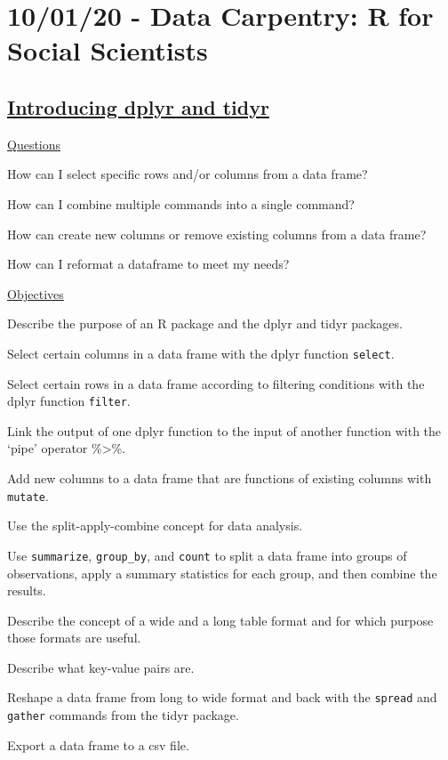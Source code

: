 \documentclass[12pt]{article}
\begin{document}
\newpage\flushleft\section{10/01/20 - Data Carpentry: R for Social Scientists}
\subsection{\href{https://datacarpentry.org/r-socialsci/03-dplyr-tidyr/index.html}{\textbf{Introducing dplyr and tidyr}}}
\color{gray}
\underline{Questions}

How can I select specific rows and/or columns from a data frame?

How can I combine multiple commands into a single command?

How can create new columns or remove existing columns from a data frame?

How can I reformat a dataframe to meet my needs?

\underline{Objectives}

Describe the purpose of an R package and the dplyr and tidyr packages.

Select certain columns in a data frame with the dplyr function \texttt{select}.

Select certain rows in a data frame according to filtering conditions with the dplyr function \texttt{filter}.

Link the output of one dplyr function to the input of another function with the ‘pipe’ operator \%\textgreater\%.

Add new columns to a data frame that are functions of existing columns with \texttt{mutate}.

Use the split-apply-combine concept for data analysis.

Use \texttt{summarize}, \texttt{group\_by}, and \texttt{count} to split a data frame into groups of observations, apply a summary statistics for each group, and then combine the results.

Describe the concept of a wide and a long table format and for which purpose those formats are useful.

Describe what key-value pairs are.

Reshape a data frame from long to wide format and back with the \texttt{spread} and \texttt{gather} commands from the tidyr package.

Export a data frame to a csv file.

\color{black}
\vspace{1em}
\end{document}
